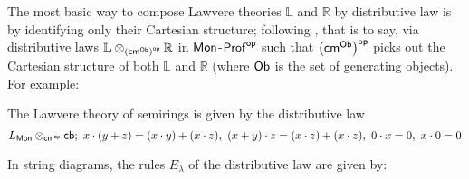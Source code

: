 The most basic way to compose Lawvere theories $\mathbb L$ and $\mathbb R$ by distributive law  is by  identifying only their Cartesian structure; following \cite[Proposition 5.4]{lawvere}, that is to say, via distributive laws $\mathbb{L} \otimes_{\left({\sf cm}^{\sf Ob}\right)^{\mathsf{op}}} \mathbb{R}$ in ${\sf Mon}$-${\sf Prof}^{\mathsf{op}}$ such that $\left({\sf cm}^{\sf Ob}\right)^{\mathsf{op}}$ picks out the Cartesian structure of both $\mathbb L$ and $\mathbb R$ (where $\sf Ob$ is the set of generating objects).  For example:
\begin{example}
The Lawvere theory of semirings is given by the distributive law
$$
L_{\sf Mon} \otimes_{{\sf cm}^{\mathsf{op}}} {\sf cb}; \
x\cdot (y+z) = (x\cdot  y)+(x\cdot z) , \
(x+ y)\cdot z = (x\cdot z)+(x\cdot z), \
0 \cdot x = 0 , \
x \cdot 0 = 0
$$
\end{example}
In string diagrams, the rules $E_\lambda$ of the distributive law are given by:
